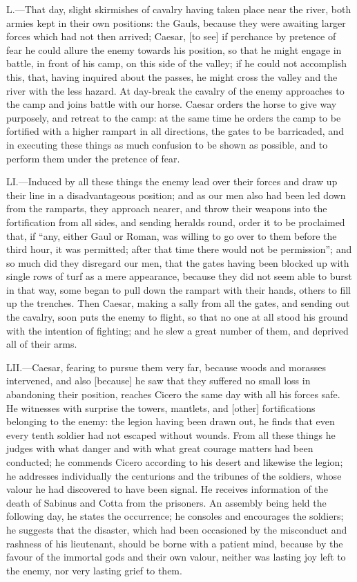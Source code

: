 L.—That day, slight skirmishes of cavalry having taken place near the
river, both armies kept in their own positions: the Gauls, because they
were awaiting larger forces which had not then arrived; Caesar, [to see]
if perchance by pretence of fear he could allure the enemy towards his
position, so that he might engage in battle, in front of his camp, on
this side of the valley; if he could not accomplish this, that, having
inquired about the passes, he might cross the valley and the river with
the less hazard. At day-break the cavalry of the enemy approaches to the
camp and joins battle with our horse. Caesar orders the horse to give
way purposely, and retreat to the camp: at the same time he orders the
camp to be fortified with a higher rampart in all directions, the gates
to be barricaded, and in executing these things as much confusion to be
shown as possible, and to perform them under the pretence of fear.

LI.—Induced by all these things the enemy lead over their forces and
draw up their line in a disadvantageous position; and as our men also
had been led down from the ramparts, they approach nearer, and throw
their weapons into the fortification from all sides, and sending heralds
round, order it to be proclaimed that, if ``any, either Gaul or Roman,
was willing to go over to them before the third hour, it was permitted;
after that time there would not be permission''; and so much did they
disregard our men, that the gates having been blocked up with single
rows of turf as a mere appearance, because they did not seem able to
burst in that way, some began to pull down the rampart with their hands,
others to fill up the trenches. Then Caesar, making a sally from all the
gates, and sending out the cavalry, soon puts the enemy to flight, so
that no one at all stood his ground with the intention of fighting; and
he slew a great number of them, and deprived all of their arms.

LII.—Caesar, fearing to pursue them very far, because woods and
morasses intervened, and also [because] he saw that they suffered no
small loss in abandoning their position, reaches Cicero the same day
with all his forces safe. He witnesses with surprise the towers,
mantlets, and [other] fortifications belonging to the enemy: the legion
having been drawn out, he finds that even every tenth soldier had not
escaped without wounds. From all these things he judges with what danger
and with what great courage matters had been conducted; he commends
Cicero according to his desert and likewise the legion; he addresses
individually the centurions and the tribunes of the soldiers, whose
valour he had discovered to have been signal. He receives information of
the death of Sabinus and Cotta from the prisoners. An assembly being
held the following day, he states the occurrence; he consoles and
encourages the soldiers; he suggests that the disaster, which had been
occasioned by the misconduct and rashness of his lieutenant, should be
borne with a patient mind, because by the favour of the immortal gods
and their own valour, neither was lasting joy left to the enemy, nor
very lasting grief to them.

